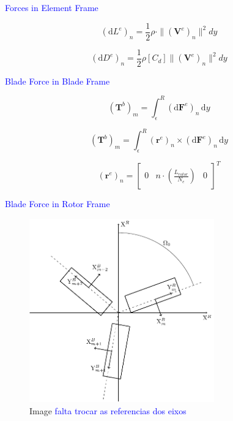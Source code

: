 \textcolor{blue}{Forces in Element Frame}

\begin{equation}
    (\mathrm{d}L^{e})_n = \frac{1}{2} \rho \cdot   \|  \left( \mathbf{V}^e \right)_n \| ^2 dy
    \label{eq:elementary_lift}
\end{equation}

\begin{equation}
    (\mathrm{d}D^{e})_n = \frac{1}{2} \rho \left[ C_d \right] \|  \left( \mathbf{V}^e \right)_n \| ^2 dy
    \label{eq:elementary_drag}
\end{equation}

\textcolor{blue}{Blade Force in Blade Frame}

\begin{equation}
    \left(\mathbf{T}^{b}\right)_m = \int_\epsilon^R \left( \mathrm{d}\mathbf{F}^{e}\right)_n \, \mathrm{d}y
\end{equation}

\begin{equation}
    \left(\mathbf{T}^{b}\right)_m = \int_\epsilon^R \left(\mathbf{r}^e \right)_n \times \left( \mathrm{d}\mathbf{F}^{e}\right)_n \, \mathrm{d}y
\end{equation}


\begin{equation}
    \left(\mathbf{r}^e \right)_n = \begin{bmatrix} 0 & n \cdot \left(\frac{L_{rotor}}{N_e}\right) & 0 \end{bmatrix}^T
\end{equation}



\textcolor{blue}{Blade Force in Rotor Frame}

\begin{figure}[!htb]
    \centering
        \includegraphics[width=8cm]{Figures/implementation/bet/blade_forces/multiple_blades_reference.pdf}
        \caption{Image \textcolor{blue}{falta trocar as referencias dos eixos}}
\end{figure}

